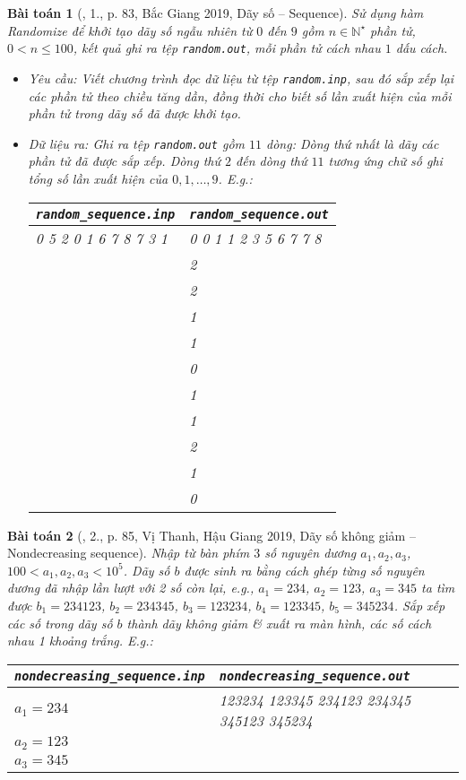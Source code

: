 \documentclass{article}
\newtheorem{baitoan}{Bài toán}
\begin{document}
\begin{baitoan}[\cite{VietSTEM2021}, 1., p. 83, Bắc Giang 2019, Dãy số -- Sequence]
	Sử dụng hàm Randomize để khởi tạo dãy số ngẫu nhiên từ $0$ đến $9$ gồm $n\in\mathbb{N}^\star$ phần tử, $0 < n\le100$, kết quả ghi ra tệp \verb|random.out|, mỗi phần tử cách nhau $1$ dấu cách.
	\begin{itemize}
		\item {\sf Yêu cầu:} Viết chương trình đọc dữ liệu từ tệp \verb|random.inp|, sau đó sắp xếp lại các phần tử theo chiều tăng dần, đồng thời cho biết số lần xuất hiện của mỗi phần tử trong dãy số đã được khởi tạo.
		\item {\sf Dữ liệu ra:} Ghi ra tệp \verb|random.out| gồm $11$ dòng: Dòng thứ nhất là dãy các phần tử đã được sắp xếp. Dòng thứ $2$ đến dòng thứ $11$ tương ứng chữ số ghi tổng số lần xuất hiện của $0,1,\ldots,9$. E.g.:
		\begin{table}[H]
			\centering
			\begin{tabular}{|l|l|}
				\hline
				\verb|random_sequence.inp| & \verb|random_sequence.out| \\
				\hline
				0 5 2 0 1 6 7 8 7 3 1 & 0 0 1 1 2 3 5 6 7 7 8 \\
				& 2 \\
				& 2 \\
				& 1 \\
				& 1 \\
				& 0 \\
				& 1 \\
				& 1 \\
				& 2 \\
				& 1 \\
				& 0 \\
				\hline
			\end{tabular}
		\end{table}
	\end{itemize}
\end{baitoan}

\begin{baitoan}[\cite{VietSTEM2021}, 2., p. 85, Vị Thanh, Hậu Giang 2019, Dãy số không giảm -- Nondecreasing sequence]
	Nhập từ bàn phím $3$ số nguyên dương $a_1,a_2,a_3$, $100 < a_1,a_2,a_3 < 10^5$. Dãy số $b$ được sinh ra bằng cách ghép từng số nguyên dương đã nhập lần lượt với 2 số còn lại, e.g., $a_1 = 234$, $a_2 = 123$, $a_3 = 345$ ta tìm được $b_1 = 234123$, $b_2 = 234345$, $b_3 = 123234$, $b_4 = 123345$, $b_5 = 345234$. Sắp xếp các số trong dãy số $b$ thành dãy không giảm \& xuất ra màn hình, các số cách nhau 1 khoảng trắng. E.g.:
	\begin{table}[H]
		\centering
		\begin{tabular}{|l|l|}
			\hline
			\verb|nondecreasing_sequence.inp| & \verb|nondecreasing_sequence.out| \\
			\hline
			$a_1 = 234$  & 123234 123345 234123 234345 345123 345234 \\
			$a_2 = 123$ & \\
			$a_3 = 345$ & \\
			\hline
		\end{tabular}
	\end{table}
\end{baitoan}
\end{document}
